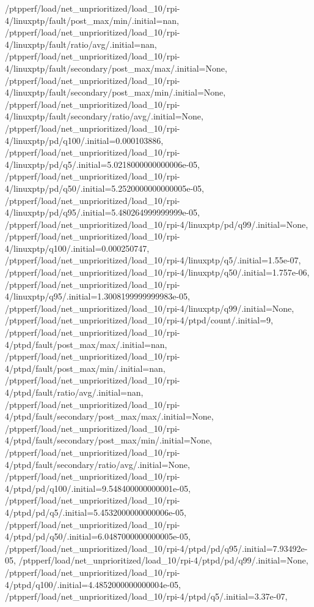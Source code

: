 {    /ptpperf/load/net_unprioritized/load_10/rpi-4/linuxptp/fault/post_max/min/.initial=nan,
    /ptpperf/load/net_unprioritized/load_10/rpi-4/linuxptp/fault/ratio/avg/.initial=nan,
    /ptpperf/load/net_unprioritized/load_10/rpi-4/linuxptp/fault/secondary/post_max/max/.initial=None,
    /ptpperf/load/net_unprioritized/load_10/rpi-4/linuxptp/fault/secondary/post_max/min/.initial=None,
    /ptpperf/load/net_unprioritized/load_10/rpi-4/linuxptp/fault/secondary/ratio/avg/.initial=None,
    /ptpperf/load/net_unprioritized/load_10/rpi-4/linuxptp/pd/q100/.initial=0.000103886,
    /ptpperf/load/net_unprioritized/load_10/rpi-4/linuxptp/pd/q5/.initial=5.0218000000000006e-05,
    /ptpperf/load/net_unprioritized/load_10/rpi-4/linuxptp/pd/q50/.initial=5.2520000000000005e-05,
    /ptpperf/load/net_unprioritized/load_10/rpi-4/linuxptp/pd/q95/.initial=5.480264999999999e-05,
    /ptpperf/load/net_unprioritized/load_10/rpi-4/linuxptp/pd/q99/.initial=None,
    /ptpperf/load/net_unprioritized/load_10/rpi-4/linuxptp/q100/.initial=0.000250747,
    /ptpperf/load/net_unprioritized/load_10/rpi-4/linuxptp/q5/.initial=1.55e-07,
    /ptpperf/load/net_unprioritized/load_10/rpi-4/linuxptp/q50/.initial=1.757e-06,
    /ptpperf/load/net_unprioritized/load_10/rpi-4/linuxptp/q95/.initial=1.3008199999999983e-05,
    /ptpperf/load/net_unprioritized/load_10/rpi-4/linuxptp/q99/.initial=None,
    /ptpperf/load/net_unprioritized/load_10/rpi-4/ptpd/count/.initial=9,
    /ptpperf/load/net_unprioritized/load_10/rpi-4/ptpd/fault/post_max/max/.initial=nan,
    /ptpperf/load/net_unprioritized/load_10/rpi-4/ptpd/fault/post_max/min/.initial=nan,
    /ptpperf/load/net_unprioritized/load_10/rpi-4/ptpd/fault/ratio/avg/.initial=nan,
    /ptpperf/load/net_unprioritized/load_10/rpi-4/ptpd/fault/secondary/post_max/max/.initial=None,
    /ptpperf/load/net_unprioritized/load_10/rpi-4/ptpd/fault/secondary/post_max/min/.initial=None,
    /ptpperf/load/net_unprioritized/load_10/rpi-4/ptpd/fault/secondary/ratio/avg/.initial=None,
    /ptpperf/load/net_unprioritized/load_10/rpi-4/ptpd/pd/q100/.initial=9.548400000000001e-05,
    /ptpperf/load/net_unprioritized/load_10/rpi-4/ptpd/pd/q5/.initial=5.4532000000000006e-05,
    /ptpperf/load/net_unprioritized/load_10/rpi-4/ptpd/pd/q50/.initial=6.0487000000000005e-05,
    /ptpperf/load/net_unprioritized/load_10/rpi-4/ptpd/pd/q95/.initial=7.93492e-05,
    /ptpperf/load/net_unprioritized/load_10/rpi-4/ptpd/pd/q99/.initial=None,
    /ptpperf/load/net_unprioritized/load_10/rpi-4/ptpd/q100/.initial=4.4852000000000004e-05,
    /ptpperf/load/net_unprioritized/load_10/rpi-4/ptpd/q5/.initial=3.37e-07,
}
